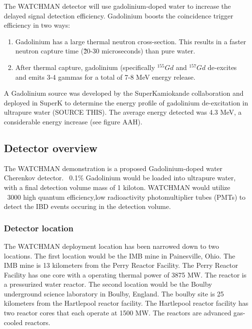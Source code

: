 \documentclass{article}
\begin{document}
The WATCHMAN detector will use gadolinium-doped water to increase the delayed
signal detection efficiency.  Gadolinium boosts the coincidence trigger
efficiency in two ways:
\begin{enumerate}
    \item Gadolinium has a large thermal neutron cross-section. This results
        in a faster neutron capture time (\~20-30 microseconds) than pure water.
    \item After thermal capture, gadolinium (specifically $^{155}Gd$ and 
        $^{157}Gd$ de-excites and emits 3-4 gammas for a total of 7-8 MeV
        energy release.
\end{enumerate}

A Gadolinium source was developed by the SuperKamiokande collaboration and
deployed in SuperK to determine the energy profile of gadolinium de-excitation
in ultrapure water (SOURCE THIS).  The average energy detected was 4.3 MeV,
a considerable energy increase (see figure AAH).

\subsection{Detector overview}

The WATCHMAN demonstration is a proposed Gadolinium-doped water Cherenkov
detector.  ~0.1\% Gadolinium would be loaded into ultrapure water, with a 
final detection volume mass of 1 kiloton.  WATCHMAN would utilize ~3000
high quantum efficiency,low radioactivity photomultiplier tubes (PMTs) to
detect the IBD events occuring in the detection volume.

\subsubsection{Detector location}
The WATCHMAN deployment location has been narrowed down to two locations.
The first location would be the IMB mine in Painesville, Ohio.  The IMB
mine is 13 kilometers from the Perry Reactor Facility.  The Perry Reactor
Facility has one core with a operating thermal power of 3875 MW. The reactor
is a pressurized water reactor. 
The second location would be the Boulby underground science laboratory in
Boulby, England.  The boulby site is 25 kilometers from the Hartlepool
reactor facility.  The Hartlepool reactor facility has two reactor cores
that each operate at 1500 MW.  The reactors are advanced gas-cooled reactors.
\end{document}
